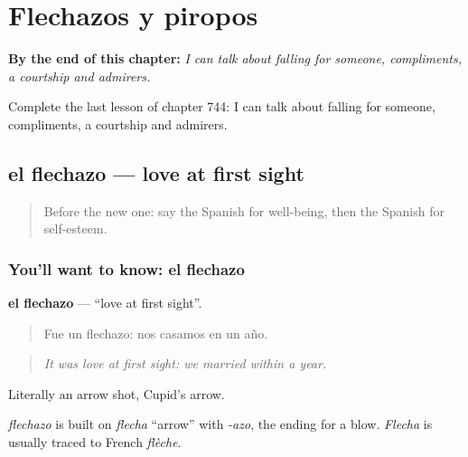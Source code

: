 
\chapter{Flechazos y piropos}
\label{ch:es-flechazos-y-piropos}

\begin{chapteropening}
\textbf{By the end of this chapter:} \emph{I can talk about falling for someone, compliments, a courtship and admirers.}

Complete the last lesson of chapter 744: I can talk about falling for someone, compliments, a courtship and admirers.
\end{chapteropening}

\section[el flechazo]{el flechazo — love at first sight}

\label{lesson:ES-C744-flechazo}



\begin{quote}
Before the new one: say the Spanish for well-being, then the Spanish for self-esteem.
\end{quote}

\subsection*{You'll want to know: el flechazo}
\textbf{el flechazo} — \textquotedblleft{}love at first sight\textquotedblright{}.

\begin{quote}
Fue un flechazo: nos casamos en un año.
\end{quote}

\begin{quote}
\emph{It was love at first sight: we married within a year.}
\end{quote}

Literally an arrow shot, Cupid's arrow.

\begin{cousinweb}
\emph{flechazo} is built on \emph{flecha} \textquotedblleft{}arrow\textquotedblright{} with \emph{-azo}, the ending for a blow. \emph{Flecha} is usually traced to French \emph{flèche}.
\end{cousinweb}

